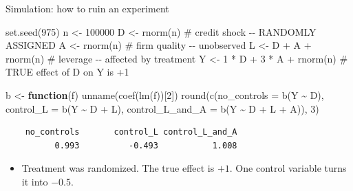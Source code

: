 \documentclass[
  11pt,
  ignorenonframetext,
  aspectratio=169,
]{beamer}
\newenvironment{Shaded}{\begin{snugshade}}{\end{snugshade}}
\newcommand{\AttributeTok}[1]{\textcolor[rgb]{0.40,0.45,0.13}{#1}}
\newcommand{\CommentTok}[1]{\textcolor[rgb]{0.37,0.37,0.37}{#1}}
\newcommand{\ControlFlowTok}[1]{\textcolor[rgb]{0.00,0.23,0.31}{\textbf{#1}}}
\newcommand{\DecValTok}[1]{\textcolor[rgb]{0.68,0.00,0.00}{#1}}
\newcommand{\FunctionTok}[1]{\textcolor[rgb]{0.28,0.35,0.67}{#1}}
\newcommand{\NormalTok}[1]{\textcolor[rgb]{0.00,0.23,0.31}{#1}}
\newcommand{\OtherTok}[1]{\textcolor[rgb]{0.00,0.23,0.31}{#1}}
\newcommand{\SpecialCharTok}[1]{\textcolor[rgb]{0.37,0.37,0.37}{#1}}
\providecommand{\tightlist}{%
  \setlength{\itemsep}{0pt}\setlength{\parskip}{0pt}}
\begin{document}
\begin{frame}[fragile]{Simulation: how to ruin an experiment}
\protect{}\label{simulation-how-to-ruin-an-experiment}
\begin{Shaded}
\begin{Highlighting}[]
\FunctionTok{set.seed}\NormalTok{(}\DecValTok{975}\NormalTok{)}
\NormalTok{n }\OtherTok{\textless{}{-}} \DecValTok{100000}
\NormalTok{D }\OtherTok{\textless{}{-}} \FunctionTok{rnorm}\NormalTok{(n)                     }\CommentTok{\# credit shock {-}{-} RANDOMLY ASSIGNED}
\NormalTok{A }\OtherTok{\textless{}{-}} \FunctionTok{rnorm}\NormalTok{(n)                     }\CommentTok{\# firm quality {-}{-} unobserved}
\NormalTok{L }\OtherTok{\textless{}{-}}\NormalTok{ D }\SpecialCharTok{+}\NormalTok{ A }\SpecialCharTok{+} \FunctionTok{rnorm}\NormalTok{(n)             }\CommentTok{\# leverage {-}{-} affected by treatment}
\NormalTok{Y }\OtherTok{\textless{}{-}} \DecValTok{1} \SpecialCharTok{*}\NormalTok{ D }\SpecialCharTok{+} \DecValTok{3} \SpecialCharTok{*}\NormalTok{ A }\SpecialCharTok{+} \FunctionTok{rnorm}\NormalTok{(n)     }\CommentTok{\# TRUE effect of D on Y is +1}

\NormalTok{b }\OtherTok{\textless{}{-}} \ControlFlowTok{function}\NormalTok{(f) }\FunctionTok{unname}\NormalTok{(}\FunctionTok{coef}\NormalTok{(}\FunctionTok{lm}\NormalTok{(f))[}\DecValTok{2}\NormalTok{])}
\FunctionTok{round}\NormalTok{(}\FunctionTok{c}\NormalTok{(}\AttributeTok{no\_controls     =} \FunctionTok{b}\NormalTok{(Y }\SpecialCharTok{\textasciitilde{}}\NormalTok{ D),}
        \AttributeTok{control\_L       =} \FunctionTok{b}\NormalTok{(Y }\SpecialCharTok{\textasciitilde{}}\NormalTok{ D }\SpecialCharTok{+}\NormalTok{ L),}
        \AttributeTok{control\_L\_and\_A =} \FunctionTok{b}\NormalTok{(Y }\SpecialCharTok{\textasciitilde{}}\NormalTok{ D }\SpecialCharTok{+}\NormalTok{ L }\SpecialCharTok{+}\NormalTok{ A)), }\DecValTok{3}\NormalTok{)}
\end{Highlighting}
\end{Shaded}

\begin{verbatim}
    no_controls       control_L control_L_and_A 
          0.993          -0.493           1.008 
\end{verbatim}

\begin{itemize}
\tightlist
\item
  Treatment was randomized. The true effect is \(+1\). One control
  variable turns it into \(-0.5\).
\end{itemize}
\end{frame}
\end{document}
